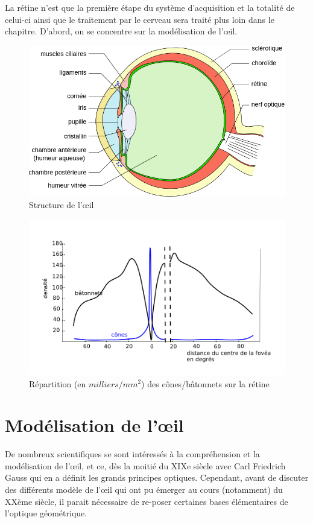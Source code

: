 	\par La rétine n'est que la première étape du système d'acquisition et la totalité de celui-ci ainsi que le traitement par le cerveau sera traité plus loin dans le chapitre. D'abord, on se concentre sur la modélisation de l'œil.
	
	\begin{figure}
		\centering
		\includegraphics[scale=.4]{Figures/SchemaOeil}
		\caption{Structure de l'œil}
		\label{fig:oeil}
	\end{figure}
	
	\begin{figure}
		\centering
		\includegraphics[scale=.35]{Figures/DensiteConesBatonnets}
		\caption{Répartition (en $milliers/mm^2$) des cônes/bâtonnets sur la rétine}
		\label{fig:densite_cones_batonnets}
	\end{figure}
	
	\section{Modélisation de l'œil}
	\par De nombreux scientifiques se sont intéressés à la compréhension et la modélisation de l'œil, et ce, dès la moitié du XIXe siècle avec Carl Friedrich Gauss qui en a définit les grands principes optiques. Cependant, avant de discuter des différents modèle de l'œil qui ont pu émerger au cours (notamment) du XXème siècle, il parait nécessaire de re-poser certaines bases élémentaires de l'optique géométrique.
	
